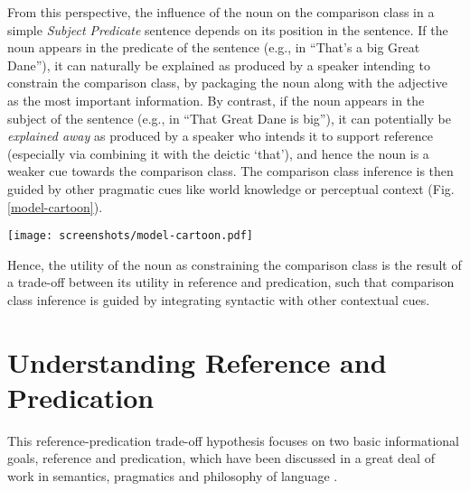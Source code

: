 From this perspective, the influence of the noun on the comparison class in a simple \textit{Subject Predicate} sentence depends on its position in the sentence. If the noun appears in the predicate of the sentence (e.g., in “That’s a big Great Dane”), it can naturally be explained as produced by a speaker intending to constrain the comparison class, by packaging the noun along with the adjective as the most important information. By contrast, if the noun appears in the subject of the sentence (e.g., in “That Great Dane is big”), it can potentially be \emph{explained away} as produced by a speaker who intends it to support reference (especially via combining it with the deictic ‘that’), and hence the noun is a weaker cue towards the comparison class. The comparison class inference is then guided by other pragmatic cues like world knowledge or perceptual context (Fig. \ref{model-cartoon}).

\begin{figure*}[t]
	\begin{center}
		\texttt{[image: screenshots/model-cartoon.pdf]}
	\end{center}
	\vspace{-2cm}
	\caption{Cartoon of the inferential account for comparison class determination. The noun (Great Dane) in a sentence can be employed either for the goal of reference (green) or predication (purple), shown in the case when this distinction is made via the syntactic position of the noun (subject S~vs.~predicate P). When the noun is used for reference (top), a listener is left with uncertainty about what to use as the comparison class (dogs or Great Danes) and integrates their world knowledge and the physical context to make this inference.  When the noun is used for predication (bottom), the listener should have less uncertainty about the comparison class: The comparison class is stipulated by the noun.}
	\label{model-cartoon}
\end{figure*}
 
Hence, the utility of the noun as constraining the comparison class is the result of a trade-off between its utility in reference and predication, such that comparison class inference is guided by integrating syntactic with other contextual cues.

\section{Understanding Reference and Predication}
\label{3.1.}
This reference-predication trade-off hypothesis focuses on two basic informational goals, reference and predication, which have been discussed in a great deal of work in semantics, pragmatics and philosophy of language \parencite{michaelson2019, Reboul2001}.
 
